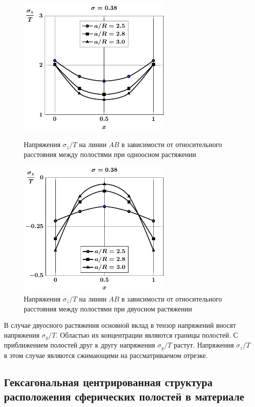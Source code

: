 \begin{figure}[th!]
\centering\footnotesize
\parbox[b]{7.5cm}{\centering\includegraphics[width=7.5cm]{spheres-cav9-a-t1-sig_z.pdf}
\caption{Напряжения $\sigma_z/T$ на линии $AB$ в зависимости от относительного расстояния между полостями при одноосном растяжении
\label{f:8:35}}}\hfil\hfil
\parbox[b]{7.5cm}{\centering\includegraphics[width=7.5cm]{spheres-cav9-a-t2-sig_z.pdf}
\caption{Напряжения $\sigma_z/T$ на линии $AB$ в зависимости от относительного расстояния между полостями при двуосном растяжении
\label{f:8:36}}}
\end{figure}

В случае двуосного растяжения основной вклад в тензор напряжений вносят напряжения $\sigma_y/T$. Областью их концентрации являются границы полостей. С приближением полостей друг к другу напряжения $\sigma_y/T$ растут. Напряжения $\sigma_z/T$ в этом случае являются сжимающими на рассматриваемом отрезке.

\subsection{Гексагональная центрированная структура расположения сферических полостей в материале}

